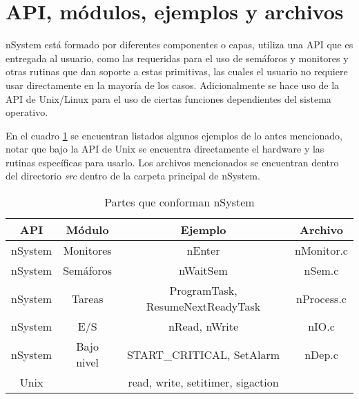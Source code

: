 \section{API, módulos, ejemplos y archivos}

nSystem está formado por diferentes componentes o capas, utiliza una API que es entregada al usuario, como las requeridas para el uso de semáforos y monitores y otras rutinas que dan soporte a estas primitivas, las cuales el usuario no requiere usar directamente en la mayoría de los casos. Adicionalmente se hace uso de la API de Unix/Linux para el uso de ciertas funciones dependientes del sistema operativo.

En el cuadro \ref{nSystem_partes} se encuentran listados algunos ejemplos de lo antes mencionado, notar que bajo la API de Unix se encuentra directamente el hardware y las rutinas específicas para usarlo. Los archivos mencionados se encuentran dentro del directorio \textit{src} dentro de la carpeta principal de nSystem.

\begin{table}[h]
	\centering
	\begin{tabular}{|c|c|c|c|}
		\hline
		 API		& Módulo			& Ejemplo														& Archivo \\
		\hline
		nSystem	& Monitores		& nEnter														& nMonitor.c \\
		nSystem	& Semáforos		& nWaitSem													& nSem.c \\
		nSystem	& Tareas			& ProgramTask, ResumeNextReadyTask	& nProcess.c \\
		nSystem	& E/S					& nRead, nWrite											& nIO.c \\
		nSystem	& Bajo nivel	& START\_CRITICAL, SetAlarm 				& nDep.c \\
		Unix		&							& read, write, setitimer, sigaction	& \\
		\hline
	\end{tabular}
	\caption{Partes que conforman nSystem}
	\label{nSystem_partes}
\end{table}
